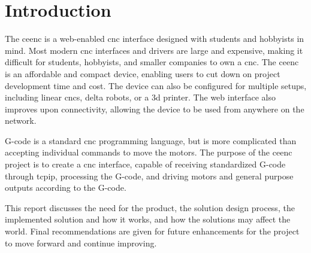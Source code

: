 \chapter{Introduction}

The \gls{ceenc} is a web-enabled \gls{cnc} interface designed with students and hobbyists in mind.
Most modern \gls{cnc} interfaces and drivers are large and expensive, making it difficult for students, hobbyists, and smaller companies to own a \gls{cnc}.
The \gls{ceenc} is an affordable and compact device, enabling users to cut down on project development time and cost.
The device can also be configured for multiple setups, including linear \gls{cnc}s, delta robots, or a \gls{3d} printer.
The web interface also improves upon connectivity, allowing the device to be used from anywhere on the network.

G-code is a standard \gls{cnc} programming language, but is more complicated than accepting individual commands to move the motors.
The purpose of the \gls{ceenc} project is to create a \gls{cnc} interface, capable of receiving standardized G-code through \gls{tcpip}, processing the G-code, and driving motors and general purpose outputs according to the G-code. 

This report discusses the need for the product, the solution design process, the implemented solution and how it works, and how the solutions may affect the world.
Final recommendations are given for future enhancements for the project to move forward and continue improving.
